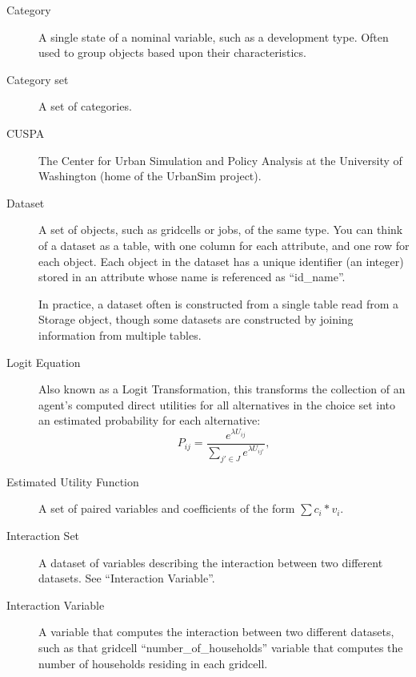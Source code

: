 \begin{description}
\item[Category] 
A single state of a nominal variable, such as a development type.
Often used to group objects based upon their characteristics. \characteristicsindex

\item[Category set] 
A set of categories.

\item[CUSPA] \cuspaindex
The Center for Urban Simulation and Policy Analysis \cuspaindex at the University of Washington
(home of the UrbanSim project).

\item[Dataset] \datasetindex
A set of objects, such as gridcells or jobs, of the same type.
You can think of a dataset \datasetindex as a table, with one column
for each attribute, \attributesindex and one row for each object.  
Each object in the dataset \datasetindex has a unique identifier (an integer) stored in
an attribute \attributesindex whose name is referenced as ``id_name''. \datasetindex  

In practice, a dataset \datasetindex often is constructed from a single
table read from a Storage object, though some datasets \datasetindex
are constructed by joining information from multiple tables.

\item[Logit Equation] 
Also known as a Logit Transformation, this transforms the
collection of an agent's computed direct utilities for all
alternatives in the choice set into an estimated probability for
each alternative:
\begin{equation}
    P_{ij}=\frac{e^{\lambda U_{ij}}}{\sum_{j' \in J}e^{\lambda
    U_{ij'}}},
\end{equation}

\item[Estimated Utility Function] 
A set of paired variables \variablesindex and coefficients \coefficientsindex of the form $\sum
c_{i}*v_{i}$.

\item[Interaction Set] 
A dataset \datasetindex of variables \variablesindex describing the interaction between two
different datasets. \datasetindex  See ``Interaction Variable''. \variablesindex

\item[Interaction Variable] 
A variable \variablesindex that computes the interaction between two different
datasets, \datasetindex such as that gridcell ``number_of_households'' 
variable \variablesindex that computes the number of households residing in
each gridcell.


\end{description}
